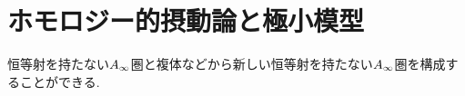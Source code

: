 \documentclass[uplatex, a4paper, 14Q, dvipdfmx]{jsarticle}
\begin{document}

\section{ホモロジー的摂動論と極小模型}

恒等射を持たない$A_{\infty}$圏と複体などから新しい恒等射を持たない$A_{\infty}$圏を構成することができる. 
\end{document}
